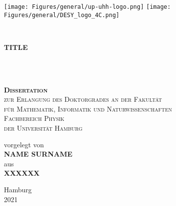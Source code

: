 
\begin{titlepage} %

\vspace*{-4cm}
\hspace*{-1.5cm}
\texttt{[image: Figures/general/up-uhh-logo.png]}
\hfill
\texttt{[image: Figures/general/DESY\_logo\_4C.png]}

\vspace{2cm}
    \centering

	\noindent\makebox[\linewidth]{\rule{1.05\textwidth}{1.5pt}} \\
	\vspace{0.4cm}
    \parbox[t]{0.96\textwidth}{\rmfamily \setlength\parfillskip{0pt} \def\baselinestretch{1.1}\centering\Huge \bfseries TITLE}\\
	\vspace{0.4cm}
	\noindent\makebox[\linewidth]{\rule{1.05\textwidth}{1.5pt}} \\
    \vspace{2 cm} %
	
	
    \parbox[p]{0.95\textwidth}{\def\baselinestretch{1.4}\centering\scshape\textbf{\LARGE Dissertation} \\ {\large zur Erlangung des Doktorgrades an der Fakult{\"a}t\\ f{\"u}r Mathematik, Informatik und Naturwissenschaften \\ Fachbereich Physik \\ der Universit{\"a}t Hamburg} }
    
    \vspace{2 cm} %

    \parbox[b]{0.93\textwidth}{\def\baselinestretch{1.3}\centering\upshape \Large vorgelegt von \\ {\LARGE\scshape \bfseries NAME SURNAME } \\ aus \\ {\scshape \bfseries XXXXXX}}
    
    \vspace{2 cm} %
    
    \parbox[b]{0.93\textwidth}{\def\baselinestretch{1.3}\centering\upshape\large Hamburg\\ 2021}

\end{titlepage}

